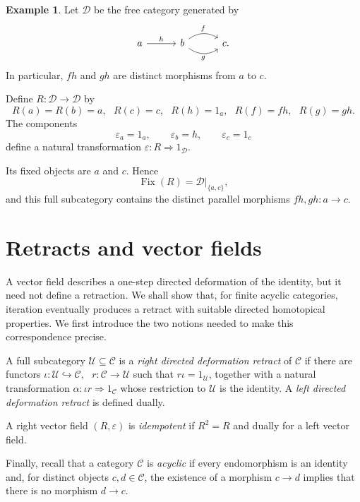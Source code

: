 \documentclass[12pt]{amsart}
\theoremstyle{definition}
\newtheorem{example}[teo]{Example}
\theoremstyle{remark}
\numberwithin{figure}{section}%
\newcommand{\CC}{\mathcal{C}}
\newcommand{\Uc}{\mathcal{U}}
\begin{document}
\begin{example}\label{ex:simple_vector_field}
Let \(\mathcal D\) be the free category generated by
\[
\begin{tikzcd}[column sep=3em]
a
  \arrow[r, "h"]
&
b
  \arrow[r, "f", bend left=35]
  \arrow[r, "g"', bend right=35]
&
c.
\end{tikzcd}
\]
In particular, \(fh\) and \(gh\) are distinct morphisms from \(a\) to
\(c\).

Define \(R\colon\mathcal D\to\mathcal D\) by
\[
R(a)=R(b)=a, \text{ }
R(c)=c,
\text{ }
R(h)=1_a,
\text{ }
R(f)=fh,
\text{ }
R(g)=gh.
\]
The components
\[
\varepsilon_a=1_a,
\qquad
\varepsilon_b=h,
\qquad
\varepsilon_c=1_c
\]
define a natural transformation
\(\varepsilon\colon R\Rightarrow1_{\mathcal D}\).

Its fixed objects are \(a\) and \(c\). Hence
\[
\operatorname{Fix}(R)
=
\mathcal D|_{\{a,c\}},
\]
and this full subcategory contains the distinct parallel morphisms
\(fh,gh\colon \allowbreak a\to c\).
\end{example}

\section{Retracts and vector fields}
\label{sec:homotopy_retracts_vector_fields}

A vector field describes a one-step directed deformation of the identity,
but it need not define a retraction. We shall show
that, for finite acyclic categories, iteration eventually produces a
retract with suitable directed homotopical properties. We first introduce
the two notions needed to make this correspondence precise.

A full subcategory \(\Uc\subseteq\CC\) is a \emph{right directed
deformation retract} of \(\CC\) if there are functors
\(
\iota\colon\Uc\hookrightarrow\CC,
\text{ }
r\colon\CC\longrightarrow\Uc
\)
such that \(r\iota=1_\Uc\), together with a natural transformation
\(
\alpha\colon\iota r\Rightarrow1_\CC
\)
whose restriction to \(\Uc\) is the identity. A \emph{left directed
deformation retract} is defined dually.

A right vector field \((R,\varepsilon)\) is \emph{idempotent} if
\(R^2=R\) and dually for a left vector field.

Finally, recall that a category \(\CC\) is \emph{acyclic} \cite[Chapter 10]{Kozlov} if every endomorphism is an identity
and, for distinct objects \(c,d\in\CC\), the existence of a morphism
\(c\to d\) implies that there is no morphism \(d\to c\).
\end{document}
